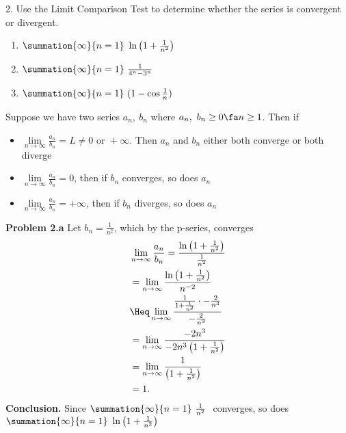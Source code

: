 \documentclass{report}
\begin{document}
    \bigbreak \noindent 
    \begin{mdframed}
        2. Use the Limit Comparison Test to determine whether the series is convergent or divergent.
        \begin{enumerate}[label=(\alph*)]
            \item $\summation{\infty}{n=1}\ \ln{\left(1+\frac{1}{n^{2}}\right)}\  $
            \item $\summation{\infty}{n=1}\ \frac{1}{4^{n} - 3^{n}}\  $
            \item $\summation{\infty}{n=1}\ (1-\cos{\frac{1}{n}})\  $
        \end{enumerate}
    \end{mdframed}
    \bigbreak \noindent 
    \begin{remark}
       Suppose we have two series $a_{n},\ b_{n}$ where $a_{n},\ b_{n} \geq 0 \fa n \geq 1$. Then if
       \begin{itemize}
           \item $\lim\limits_{n \to \infty}{\frac{a_{n}}{b_{n}}} = L \ne 0 \text{ or } +\infty$. Then $a_{n}$ and $b_{n}$ either both converge or both diverge
            \item  $\lim\limits_{n \to \infty}{\frac{a_{n}}{b_{n}}} = 0$, then if $b_{n}$ converges, so does $a_{n}$
            \item  $\lim\limits_{n \to \infty}{\frac{a_{n}}{b_{n}}} = +\infty$, then if $b_{n}$ diverges, so does $a_{n}$
       \end{itemize}
    \end{remark}
    \bigbreak \noindent 
    \textbf{Problem 2.a} Let $b_{n}  = \frac{1}{n^{2}}$, which by the p-series, converges
    \begin{align*}
        &\lim\limits_{n \to \infty}{\frac{a_{n}}{b_{n}}} = \frac{\ln{\left(1+\frac{1}{n^{2}}\right)}}{\frac{1}{n^{2}}} \\
        &=\lim\limits_{n \to \infty}{\frac{\ln{\left(1+\frac{1}{n^{2}}\right)}}{n^{-2}}} \\
        &\Heq\lim\limits_{n \to \infty}{\frac{\frac{1}{1+\frac{1}{n^{2}}} \cdot -\frac{2}{n^{3}}}{-\frac{2}{n^{3}}}} \\
        &=\lim\limits_{n \to \infty}{\frac{-2n^{3}}{-2n^{3}\left(1+\frac{1}{n^{2}}\right)}} \\
        &=\lim\limits_{n \to \infty}{\frac{1}{\left(1+\frac{1}{n^{2}}\right)}} \\
        &=1
    .\end{align*}
    \bigbreak \noindent 
    \textbf{Conclusion.} Since $\summation{\infty}{n=1}\ \frac{1}{n^{2}}\  $ converges, so does $\summation{\infty}{n=1}\ \ln{\left(1+\frac{1}{n^{2}}\right)}\  $
\end{document}
